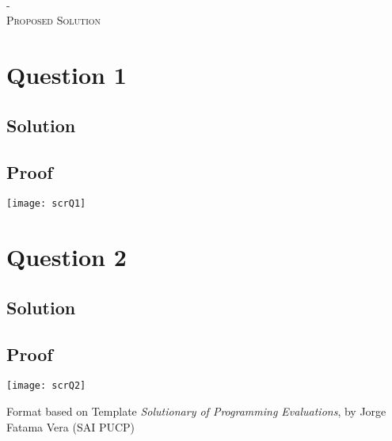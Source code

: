 \documentclass[twoside,12pt]{article}
\begin{document}

\AddToShipoutPicture{\BackgroundPic} %
\thispagestyle{empty}
\begin{center}
\begin{large}
    \textsc{\university\\}
    \textsc{\organization\\[0.75cm]}
    \textsc{\course\\}
    \textsc{\evalCourse\space- \currentCycle\\}
    \textsc{Proposed Solution\\}
\end{large}
\end{center}

\section*{Question 1}



\subsection*{Solution}
{\small

}

\subsection*{Proof}
\begin{center}
    \texttt{[image: scrQ1]}
\end{center}

\section*{Question 2}


\subsection*{Solution}
{\small

}

\subsection*{Proof}
\begin{center}
    \texttt{[image: scrQ2]}
\end{center}

\begin{flushright}
    \footnotesize{Format based on Template \textit{Solutionary of Programming Evaluations}, by Jorge Fatama Vera (SAI PUCP)}\\
\end{flushright}
\end{document}
